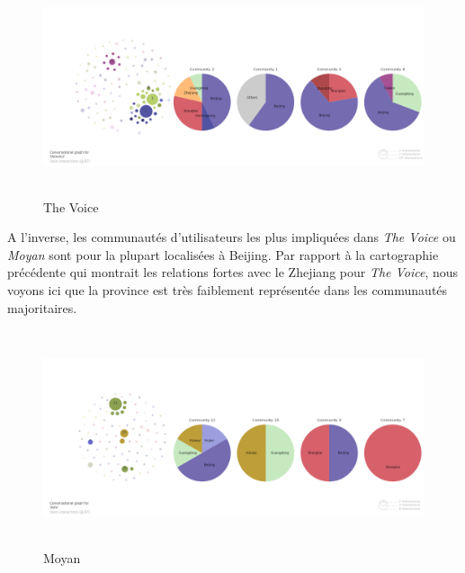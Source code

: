 \begin{figure}
    \centering

    \includegraphics[width=5.9996in,height=2.5004in]{figures/chap4/chapitre4-img56.png}
   

    \caption{
        The Voice
    }

\end{figure}




A l{\textquoteright}inverse, les communaut\'es
d{\textquoteright}utilisateurs les plus impliqu\'ees dans \textit{The
Voice }ou \textit{Moyan} sont pour la plupart localis\'ees \`a Beijing.
Par rapport \`a la cartographie pr\'ec\'edente qui montrait les
relations fortes avec le Zhejiang pour \textit{The Voice}, nous voyons
ici que la province est tr\`es faiblement repr\'esent\'ee dans les
communaut\'es majoritaires.


  \begin{figure}
    \centering

   \includegraphics[width=5.9996in,height=2.5004in]{figures/chap4/chapitre4-img57.png}
   

    \caption{
        Moyan
    }

\end{figure}


